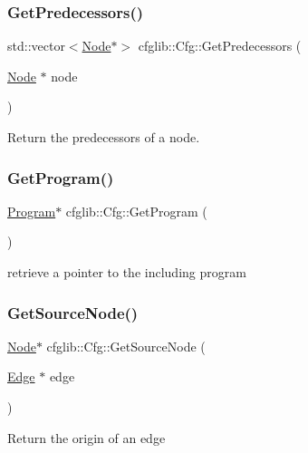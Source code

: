 \subsubsection{\texorpdfstring{Get\+Predecessors()}{GetPredecessors()}}
{\footnotesize\ttfamily std\+::vector$<$\hyperlink{classcfglib_1_1Node}{Node}$\ast$$>$ cfglib\+::\+Cfg\+::\+Get\+Predecessors (\begin{DoxyParamCaption}\item[{\hyperlink{classcfglib_1_1Node}{Node} $\ast$}]{node }\end{DoxyParamCaption})}

Return the predecessors of a node. \mbox{\label{classcfglib_1_1Cfg_aefc6931e39418420ae47e09528bba5af}} 
\subsubsection{\texorpdfstring{Get\+Program()}{GetProgram()}}
{\footnotesize\ttfamily \hyperlink{classcfglib_1_1Program}{Program}$\ast$ cfglib\+::\+Cfg\+::\+Get\+Program (\begin{DoxyParamCaption}{ }\end{DoxyParamCaption})}

retrieve a pointer to the including program \mbox{\label{classcfglib_1_1Cfg_a1b40c4d28399a71195159b3fc1057399}} 
\subsubsection{\texorpdfstring{Get\+Source\+Node()}{GetSourceNode()}}
{\footnotesize\ttfamily \hyperlink{classcfglib_1_1Node}{Node}$\ast$ cfglib\+::\+Cfg\+::\+Get\+Source\+Node (\begin{DoxyParamCaption}\item[{\hyperlink{classcfglib_1_1Edge}{Edge} $\ast$}]{edge }\end{DoxyParamCaption})}

Return the origin of an edge \mbox{\label{classcfglib_1_1Cfg_ae3c864797fe19d85c1ab303baa7e9fbb}} 

